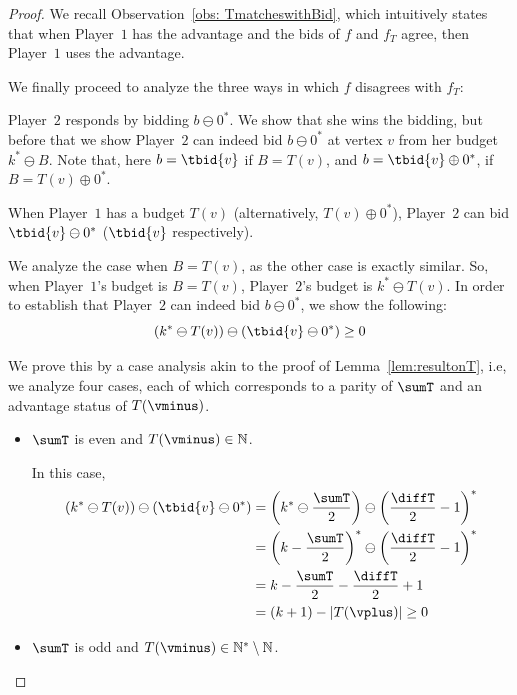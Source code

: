 \documentclass{theoretics}
\newcommand{\PO}{Player~$1$\xspace}
\newcommand{\PT}{Player~$2$\xspace}
\newcommand{\Nat}{\mathbb{N}}
\newcommand{\Natstro}{\mathbb{N}^* \setminus \mathbb{N}}
\newcommand{\succb}[1]{#1 \oplus 0^*\xspace}
\newcommand{\predb}[1]{#1 \ominus 0^*\xspace}
\newcommand{\succInt}[1]{\left(#1\right)^*}
\newcommand{\adjustbrac}[1]{\left(#1\right)}
\newcommand{\absolut}[1]{|#1|}
\newcommand{\half}[1]{\frac{#1}{2}}
\begin{document}
\begin{proof}
We recall Observation~\ref{obs: TmatcheswithBid}, which intuitively states that when \PO has the advantage and the bids of $f$ and $f_T$ agree, then \PO uses the advantage. 


We finally proceed to analyze the three ways in which $f$ disagrees with $f_T$:


\PT responds by bidding $b \ominus 0^*$. 
We show that she wins the bidding, but before that %
we show  \PT can indeed bid \(b \ominus 0^*\) at vertex \(v\) from her budget \(k^* \ominus B\).
Note that, here \(b = \tbid{v}\) if \(B = T(v)\), and \(b = \succb{\tbid{v}}\), if \(B = \succb{T(v)}\). 

\begin{claim*}\label{clm: PTcanbid}
	When \PO has a budget \(T(v)\) (alternatively, \(\succb{T(v)}\)), \PT can bid \(\predb{\tbid{v}}\) (\(\tbid{v}\) respectively). 
\end{claim*}

\begin{subproof}
	We analyze the case when  \(B = T(v)\), as the other case is exactly similar.
	So, when \PO's budget is \(B = T(v)\), \PT's budget is \(k^* \ominus T(v)\). 
	In order to establish that \PT can indeed bid \(\predb{b}\), we show the following:
	\begin{equation*}
		(k^* \ominus T(v)) \ominus (\predb{\tbid{v}}) \geq 0
	\end{equation*}
	
	We prove this by a case analysis akin to the proof of Lemma~\ref{lem:resultonT}, i.e, we analyze four cases, each of which corresponds to a parity of \(\sumT\) and an advantage status of \(T(\vminus)\). 
	\begin{itemize}
		\item \(\sumT\) is even and \(T(\vminus) \in \Nat\). 
		
		In this case, 
		\begin{align*}
			\adjustbrac{k^* \ominus T(v)} \ominus \adjustbrac{\predb{\tbid{v}}} &= \adjustbrac{k^* \ominus \half{\sumT}} \ominus \succInt{\half{\diffT} -1}\\
			&= \succInt{k - \half{\sumT}} \ominus \succInt{\half{\diffT} -1} \\
			&= k - \half{\sumT} - \half{\diffT} + 1\\
			&= \adjustbrac{k+1} - \absolut{T(\vplus)} \geq 0 
		\end{align*}
	
	\item \(\sumT\) is odd and \(T(\vminus) \in \Natstro\). 
	

\end{itemize}
\end{subproof}
\end{proof}
\end{document}
